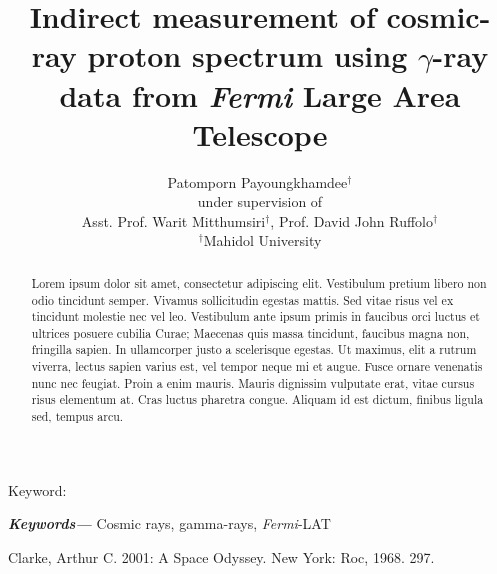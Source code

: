 \documentclass[a4paper]{article}
\title{Indirect measurement of cosmic-ray proton spectrum using $\gamma$-ray data from {\it Fermi} Large Area Telescope}
\author{
  Patomporn Payoungkhamdee$^{\dagger}$\\
  under supervision of\\
  Asst. Prof. Warit Mitthumsiri$^{\dagger}$, Prof. David John Ruffolo$^{\dagger}$\\
  \small $^{\dagger}$Mahidol University
}
\date{} %
\providecommand{\keywords}[1]
{
  \small	
  \textbf{\textit{Keywords---}} #1
}
\begin{document}
\maketitle

\begin{abstract}
\large
Lorem ipsum dolor sit amet, consectetur adipiscing elit. Vestibulum pretium libero non odio tincidunt semper. Vivamus sollicitudin egestas mattis. Sed vitae risus vel ex tincidunt molestie nec vel leo. Vestibulum ante ipsum primis in faucibus orci luctus et ultrices posuere cubilia Curae; Maecenas quis massa tincidunt, faucibus magna non, fringilla sapien. In ullamcorper justo a scelerisque egestas. Ut maximus, elit a rutrum viverra, lectus sapien varius est, vel tempor neque mi et augue. Fusce ornare venenatis nunc nec feugiat. Proin a enim mauris. Mauris dignissim vulputate erat, vitae cursus risus elementum at. Cras luctus pharetra congue. Aliquam id est dictum, finibus ligula sed, tempus arcu. 
\end{abstract} \hspace{10pt}

Keyword:
\keywords{ Cosmic rays, gamma-rays, {\it Fermi}-LAT}
\begin{thebibliography}{00}
 Clarke, Arthur C. 2001: A Space Odyssey. New York: Roc, 1968. 297.
\end{thebibliography}


\end{document}
